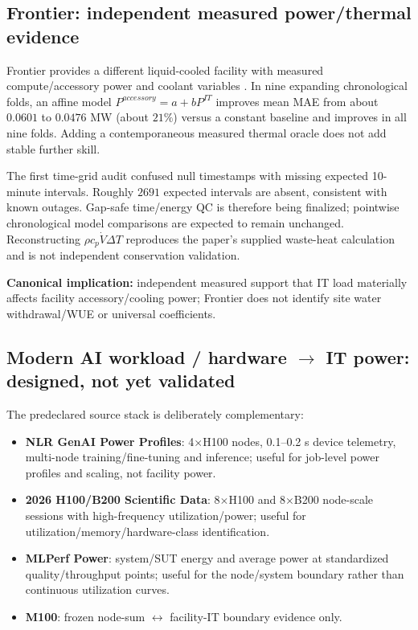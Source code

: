\documentclass[11pt]{article}
\begin{document}

\subsection{Frontier: independent measured power/thermal evidence}

Frontier provides a different liquid-cooled facility with measured compute/accessory power and coolant variables \cite{frontier}. In nine expanding chronological folds, an affine model $P^{accessory}=a+bP^{IT}$ improves mean MAE from about $0.0601$ to $0.0476$ MW (about $21\%$) versus a constant baseline and improves in all nine folds. Adding a contemporaneous measured thermal oracle does not add stable further skill.

The first time-grid audit confused null timestamps with missing expected 10-minute intervals. Roughly $2691$ expected intervals are absent, consistent with known outages. Gap-safe time/energy QC is therefore being finalized; pointwise chronological model comparisons are expected to remain unchanged. Reconstructing $\rho c_p\dot V\Delta T$ reproduces the paper's supplied waste-heat calculation and is not independent conservation validation.

\textbf{Canonical implication:} independent measured support that IT load materially affects facility accessory/cooling power; Frontier does not identify site water withdrawal/WUE or universal coefficients.

\subsection{Modern AI workload / hardware $\rightarrow$ IT power: designed, not yet validated}

The predeclared source stack is deliberately complementary:
\begin{itemize}
\item \textbf{NLR GenAI Power Profiles}: 4$\times$H100 nodes, 0.1--0.2 s device telemetry, multi-node training/fine-tuning and inference; useful for job-level power profiles and scaling, not facility power.
\item \textbf{2026 H100/B200 Scientific Data}: 8$\times$H100 and 8$\times$B200 node-scale sessions with high-frequency utilization/power; useful for utilization/memory/hardware-class identification.
\item \textbf{MLPerf Power}: system/SUT energy and average power at standardized quality/throughput points; useful for the node/system boundary rather than continuous utilization curves.
\item \textbf{M100}: frozen node-sum $\leftrightarrow$ facility-IT boundary evidence only.
\end{itemize}
\end{document}
